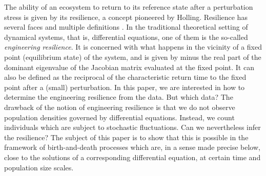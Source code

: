 \documentclass[JEP,XML,SOM,Unicode]{cedram}
\numberwithin{equation}{section}
\theoremstyle{plain}
\theoremstyle{definition}
\begin{document}
The ability of an ecosystem to return to its reference state after a perturbation stress is given by its resilience, a concept
pioneered by Holling. Resilience has several faces and multiple definitions \cite{resilience-book}. In the traditional theoretical
setting of dynamical systems, that is, differential equations, one of them is the so-called {\em engineering resilience}. It
is concerned with what happens in the vicinity of a fixed point (equilibrium state) of the system, and is given by minus the real
part of the dominant eigenvalue of the Jacobian matrix evaluated at the fixed point. It can also be defined as the reciprocal of
the characteristic return time to the fixed point after a (small) perturbation.
In this paper, we are interested in how to determine the engineering resilience from the data. But which data?
The drawback of the notion of engineering resilience is that we do not observe population densities governed by differential equations.
Instead, we count individuals which are subject to stochastic fluctuations. Can we nevertheless infer the resilience? The subject of this
paper is to show that this is possible in the framework of birth-and-death processes which are, in a sense made precise below,
close to the solutions of a corresponding differential equation, at certain time and population size scales.
\end{document}
